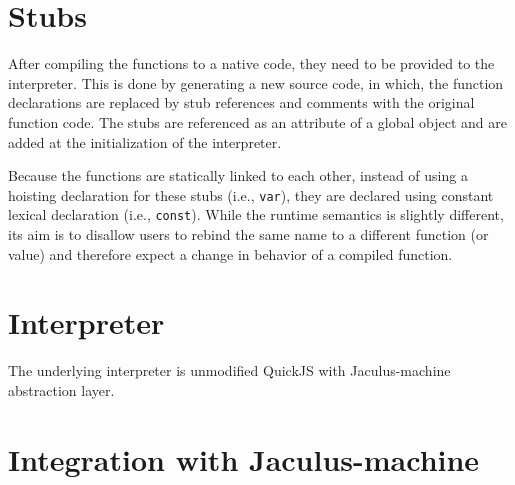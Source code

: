 \section{Stubs}

After compiling the functions to a native code, they need to be provided to the interpreter. This is done by generating a new source code, in which, the function declarations are replaced by stub references and comments with the original function code. The stubs are referenced as an attribute of a global object and are added at the initialization of the interpreter.

Because the functions are statically linked to each other, instead of using a hoisting declaration for these stubs (i.e., \texttt{var}), they are declared using constant lexical declaration (i.e., \texttt{const}). While the runtime semantics is slightly different, its aim is to disallow users to rebind the same name to a different function (or value) and therefore expect a change in behavior of a compiled function.


\section{Interpreter}

The underlying interpreter is unmodified QuickJS with Jaculus-machine abstraction layer.

\section{Integration with Jaculus-machine}

